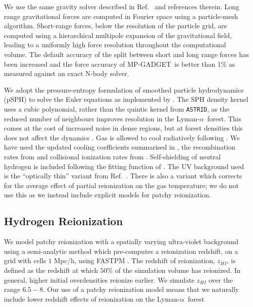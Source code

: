 \documentclass[a4paper,11pt]{article}
\newcommand{\Lya}{Lyman-$\alpha$}
\newcommand{\astrid}{\texttt{ASTRID}}
\newcommand{\mpgadget}{{\small MP-GADGET}}
\begin{document}
We use the same gravity solver described in Ref.~\cite{Bird:2022} and references therein. Long range gravitational forces are computed in Fourier space using a particle-mesh algorithm. Short-range forces, below the resolution of the particle grid, are computed using a hierarchical multipole expansion of the gravitational field, leading to a uniformly high force resolution throughout the computational volume. The default accuracy of the split between short and long range forces has been increased and the force accuracy of \mpgadget~is better than 1\% as measured against an exact N-body solver.

We adopt the pressure-entropy formulation of smoothed particle hydrodynamics (pSPH) to solve the Euler equations \citep{Hopkins:2013,Read:2010} as implemented by \cite{Feng:2014}. %
The SPH density kernel uses a cubic polynomial, rather than the quintic kernel from \astrid, as the reduced number of neighbours improves resolution in the \Lya~forest. This comes at the cost of increased noise in dense regions, but at forest densities this does not affect the dynamics \cite{Bird:2013}.
Gas is allowed to cool radiatively following \citep{Katz:1996}.
We have used the updated cooling coefficients summarised in \cite{Bolton:2017}, the recombination rates from \cite{Verner:1996} and collisional ionization rates from \cite{Voronov:1997}. Self-shielding of neutral hydrogen is included following the fitting function of \cite{Rahmati:2013}.
The UV background used is the ``optically thin'' variant from Ref.~\cite{FG2020}. There is also a variant which corrects for the average effect of partial reionization on the gas temperature; we do not use this as we instead include explicit models for patchy reionization.

\subsection{Hydrogen Reionization}
\label{sec:hydrogen}

We model patchy reionization with a spatially varying ultra-violet background using a semi-analytic method \cite{Battaglia:2013} which pre-computes a reionization redshift, on a grid with cells $1$ Mpc/h, using FASTPM \cite{FASTPM}. The redshift of reionization, $z_{HI}$, is defined as the redshift at which $50\%$ of the simulation volume has reionized. In general, higher initial overdensities reionize earlier. We simulate $z_{HI}$ over the range $6.5 - 8$. Our use of a patchy reionization model means that we naturally include lower redshift effects of reionization on the \Lya~forest \citep{Montero:2019}
\end{document}

